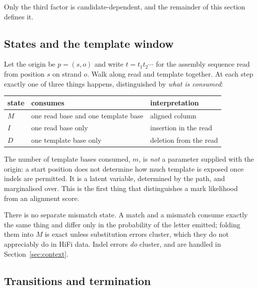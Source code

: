 \documentclass[11pt]{article}
\begin{document}
Only the third factor is candidate-dependent, and the remainder of this section
defines it.

\subsection{States and the template window}

Let the origin be $p = (s,o)$ and write $t = t_1 t_2 \cdots$ for the assembly
sequence read from position $s$ on strand $o$.  Walk along read and template
together.  At each step exactly one of three things happens, distinguished by
\emph{what is consumed}:

\begin{center}
\begin{tabular}{lll}
\toprule
state & consumes & interpretation \\
\midrule
$M$ & one read base and one template base & aligned column \\
$I$ & one read base only & insertion in the read \\
$D$ & one template base only & deletion from the read \\
\bottomrule
\end{tabular}
\end{center}

The number of template bases consumed, $m$, is \emph{not} a parameter supplied
with the origin: a start position does not determine how much template is
exposed once indels are permitted.  It is a latent variable, determined by the
path, and marginalised over.  This is the first thing that distinguishes a mark
likelihood from an alignment score.

There is no separate mismatch state.  A match and a mismatch consume exactly
the same thing and differ only in the probability of the letter emitted;
folding them into $M$ is exact unless substitution errors cluster, which they
do not appreciably do in HiFi data.  Indel errors \emph{do} cluster, and are
handled in Section~\ref{sec:context}.

\subsection{Transitions and termination}
\end{document}
